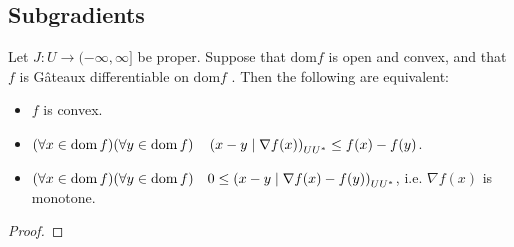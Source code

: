 \subsection{Subgradients}
\begin{proposition}
	 Let $J: U \rightarrow (-\infty, \infty]$ be proper. Suppose that $\text{dom} f$
	 is open and convex, and that $f$ is G\^ateaux differentiable on $\text{dom} f$ . Then the
	 following are equivalent:
	 \begin{itemize}
		 \item $f$ is convex.
		 \item $(\forall x \in \mathrm{dom\,} f )(\forall y \in \mathrm{dom\,} f )\quad \left(x-y\mid \nabla f(x)\right)_{UU^*}\leq f(x)-f(y)$.
		 \item $(\forall x \in \mathrm{dom\,} f )(\forall y \in \mathrm{dom\,} f )\quad 0 \leq \left(x-y\mid \nabla f(x)-f(y)\right)_{UU^*}$, i.e. $
		 \nabla f(x)$ is monotone.
	 \end{itemize}
	 \begin{proof}
	 
	 \end{proof}
\label{prop5. First derivative convex.}
\end{proposition}

